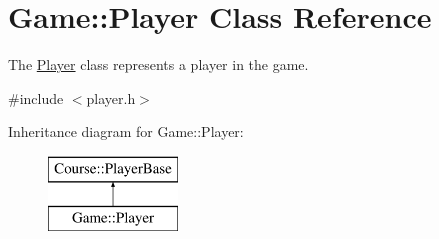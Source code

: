\hypertarget{classGame_1_1Player}{\section{Game\-:\-:Player Class Reference}
\label{classGame_1_1Player}
}


The \hyperlink{classGame_1_1Player}{Player} class represents a player in the game.  




{\ttfamily \#include $<$player.\-h$>$}

Inheritance diagram for Game\-:\-:Player\-:\begin{figure}[H]
\begin{center}
\leavevmode
\includegraphics[height=2.000000cm]{classGame_1_1Player}
\end{center}
\end{figure}
